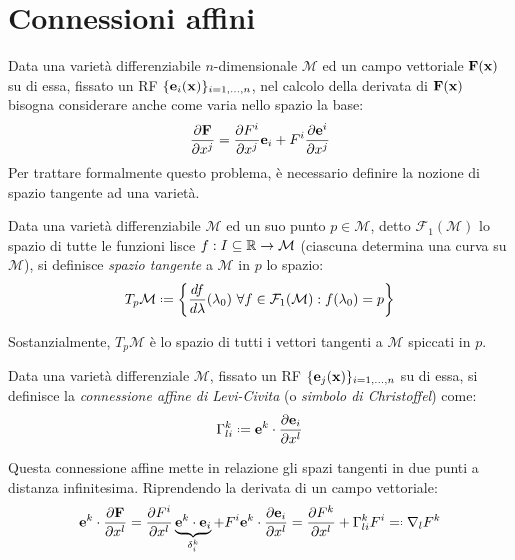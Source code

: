 
\section{Connessioni affini}

Data una varietà differenziabile $ n $-dimensionale $ \mathcal{M} $ ed un campo vettoriale $ \mathbf{F}(\mathbf{x}) $ su di essa, fissato un RF $ \{\mathbf{e}_i (\mathbf{x})\}_{i = 1, \dots, n} $, nel calcolo della derivata di $ \mathbf{F}(\mathbf{x}) $ bisogna considerare anche come varia nello spazio la base:
\begin{equation}
	\frac{\partial \mathbf{F}}{\partial x^j} = \frac{\partial F^i}{\partial x^j} \mathbf{e}_i + F^i \frac{\partial \mathbf{e}^i}{\partial x^j}
	\label{eq:4.1}
\end{equation}
Per trattare formalmente questo problema, è necessario definire la nozione di spazio tangente ad una varietà.
\begin{definition}
	Data una varietà differenziabile $ \mathcal{M} $ ed un suo punto $ p \in \mathcal{M} $, detto $ \mathcal{F}_1(\mathcal{M}) $ lo spazio di tutte le funzioni lisce $ f : I \subseteq \mathbb{R} \rightarrow \mathcal{M} $ (ciascuna determina una curva su $ \mathcal{M} $), si definisce \textit{spazio tangente} a $ \mathcal{M} $ in $ p $ lo spazio:
	\begin{equation}
		T_p\mathcal{M} \defeq \biggl\{ \frac{df}{d\lambda}(\lambda_0) \,\,\forall f \in \mathcal{F}_1(\mathcal{M}) : f(\lambda_0) = p \biggl\}
		\label{eq:4.2}
	\end{equation}
\end{definition}
Sostanzialmente, $ T_p\mathcal{M} $ è lo spazio di tutti i vettori tangenti a $ \mathcal{M} $ spiccati in $ p $.
\begin{definition}
	Data una varietà differenziale $ \mathcal{M} $, fissato un RF $ \{\mathbf{e}_j(\mathbf{x})\}_{i = 1, \dots, n} $ su di essa, si definisce la \textit{connessione affine di Levi-Civita} (o \textit{simbolo di Christoffel}) come:
	\begin{equation}
		\Gamma^k_{li} \defeq \ve{e}^k \cdot \frac{\pa \ve{e}_i}{\pa x^l}
		\label{eq:4.3}
	\end{equation}
\end{definition}
Questa connessione affine mette in relazione gli spazi tangenti in due punti a distanza infinitesima.
Riprendendo la derivata di un campo vettoriale:
\begin{equation}
	\ve{e}^k \cdot \frac{\pa \ve{F}}{\pa x^l} = \frac{\pa F^i}{\pa x^l} \underbrace{\ve{e}^k \cdot \ve{e}_i}_{\delta^k_i} + F^i \ve{e}^k \cdot \frac{\pa \ve{e}_i}{\pa x^l} = \frac{\pa F^k}{\pa x^l} + \Gamma^k_{li} F^i \eqdef \nabla_l F^k
	\label{eq:4.4}
\end{equation}
